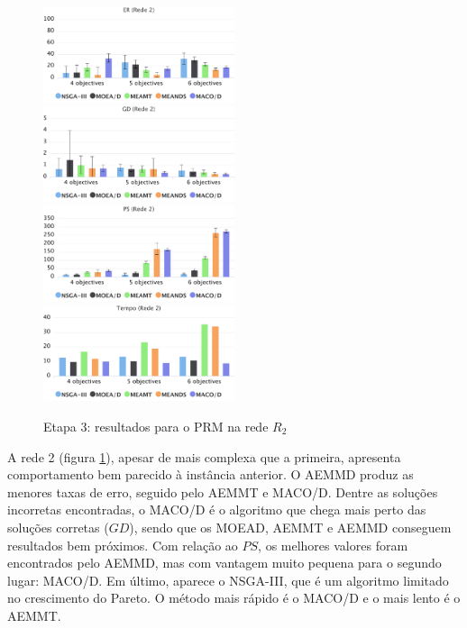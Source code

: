\begin{figure}[!htbp]
	\caption{Etapa 3: resultados para o PRM na rede $R_2$}
	\label{fig_exp3_prm_r2}
	\includegraphics[width=0.5\textwidth]{cap_experimentos/figs/etapa3/er-mrp-r2}
	\includegraphics[width=0.5\textwidth]{cap_experimentos/figs/etapa3/gd-mrp-r2}
	\includegraphics[width=0.5\textwidth]{cap_experimentos/figs/etapa3/ps-mrp-r2}
	\includegraphics[width=0.5\textwidth]{cap_experimentos/figs/etapa3/time-mrp-r2}
\end{figure}

A rede 2 (figura \ref{fig_exp3_prm_r2}), apesar de mais complexa que a primeira, apresenta comportamento bem parecido à instância anterior. O AEMMD produz as menores taxas de erro, seguido pelo AEMMT e MACO/D. Dentre as soluções incorretas encontradas, o MACO/D é o algoritmo que chega mais perto das soluções corretas ($GD$), sendo que os MOEAD, AEMMT e AEMMD conseguem resultados bem próximos. Com relação ao $PS$, os melhores valores foram encontrados pelo AEMMD, mas com vantagem muito pequena para o segundo lugar: MACO/D. Em último, aparece o NSGA-III, que é um algoritmo limitado no crescimento do Pareto. O método mais rápido é o MACO/D e o mais lento é o AEMMT.


